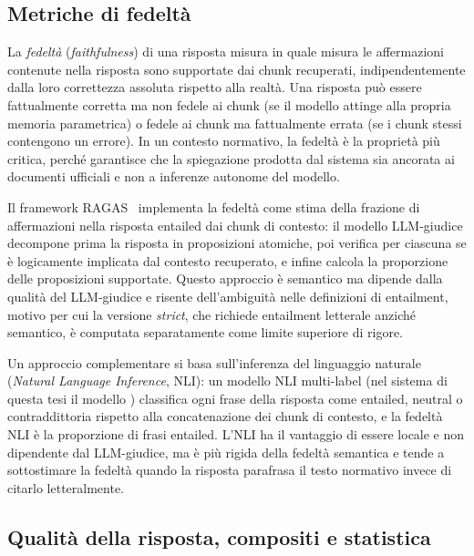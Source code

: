 \subsection{Metriche di fedeltà}
\label{subsec:metr-faithfulness}

La \emph{fedeltà} (\emph{faithfulness}) di una risposta misura in quale misura
le affermazioni contenute nella risposta sono supportate dai chunk recuperati,
indipendentemente dalla loro correttezza assoluta rispetto alla realtà. Una
risposta può essere fattualmente corretta ma non fedele ai chunk (se il
modello attinge alla propria memoria parametrica) o fedele ai chunk ma
fattualmente errata (se i chunk stessi contengono un errore). In un contesto
normativo, la fedeltà è la proprietà più critica, perché garantisce che la
spiegazione prodotta dal sistema sia ancorata ai documenti ufficiali e non
a inferenze autonome del modello.

Il framework RAGAS~\cite{ragas2024} implementa la fedeltà come stima della
frazione di affermazioni nella risposta entailed dai chunk di contesto: il
modello LLM-giudice decompone prima la risposta in proposizioni atomiche,
poi verifica per ciascuna se è logicamente implicata dal contesto recuperato,
e infine calcola la proporzione delle proposizioni supportate. Questo approccio
è semantico ma dipende dalla qualità del LLM-giudice e risente dell'ambiguità
nelle definizioni di entailment, motivo per cui la versione \emph{strict},
che richiede entailment letterale anziché semantico, è computata
separatamente come limite superiore di rigore.

Un approccio complementare si basa sull'inferenza del linguaggio naturale
(\emph{Natural Language Inference}, NLI): un modello NLI multi-label (nel sistema di questa tesi il modello
\nlimodel{}) classifica ogni frase della risposta come entailed, neutral
o contraddittoria rispetto alla concatenazione dei chunk di contesto, e la
fedeltà NLI è la proporzione di frasi entailed. L'NLI ha il vantaggio di
essere locale e non dipendente dal LLM-giudice, ma è più rigida della
fedeltà semantica e tende a sottostimare la fedeltà quando la risposta
parafrasa il testo normativo invece di citarlo letteralmente.

\subsection{Qualità della risposta, compositi e statistica}
\label{subsec:metr-quality}

